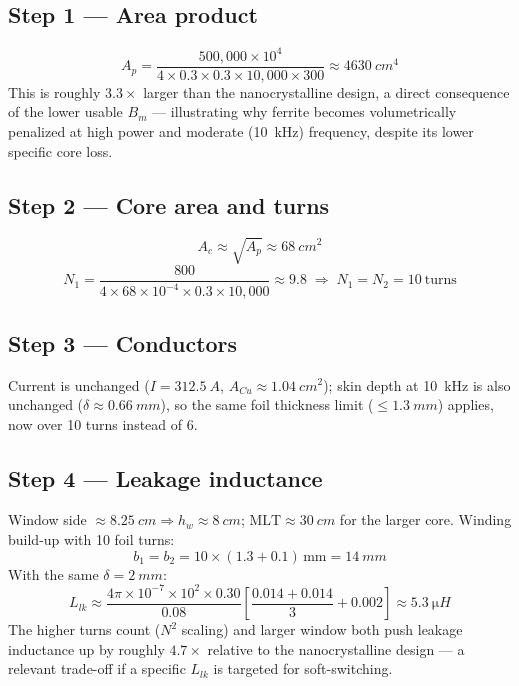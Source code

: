\documentclass[11pt,a4paper]{article}
\begin{document}
\subsection*{Step 1 — Area product}
\begin{equation}
    A_p = \frac{500{,}000\times10^4}{4\times0.3\times0.3\times10{,}000\times300}
    \approx \SI{4630}{cm^4}
\end{equation}
This is roughly $3.3\times$ larger than the nanocrystalline design, a direct
consequence of the lower usable $B_m$ — illustrating why ferrite becomes
volumetrically penalized at high power and moderate (\SI{10}{kHz}) frequency,
despite its lower specific core loss.

\subsection*{Step 2 — Core area and turns}
\begin{equation}
    A_c \approx \sqrt{A_p} \approx \SI{68}{cm^2}
\end{equation}
\begin{equation}
    N_1 = \frac{800}{4\times68\times10^{-4}\times0.3\times10{,}000}
    \approx 9.8 \;\Rightarrow\; N_1=N_2=10 \ \text{turns}
\end{equation}

\subsection*{Step 3 — Conductors}
Current is unchanged ($I=\SI{312.5}{A}$, $A_{Cu}\approx\SI{1.04}{cm^2}$); skin
depth at \SI{10}{kHz} is also unchanged ($\delta\approx\SI{0.66}{mm}$), so the
same foil thickness limit ($\le\SI{1.3}{mm}$) applies, now over 10 turns instead
of 6.

\subsection*{Step 4 — Leakage inductance}
Window side $\approx\SI{8.25}{cm}\Rightarrow h_w\approx\SI{8}{cm}$;
$\mathrm{MLT}\approx\SI{30}{cm}$ for the larger core. Winding build-up with 10
foil turns:
\begin{equation}
    b_1=b_2=10\times(1.3+0.1)\,\text{mm}=\SI{14}{mm}
\end{equation}
With the same $\delta=\SI{2}{mm}$:
\begin{equation}
    L_{lk} \approx \frac{4\pi\times10^{-7}\times10^2\times0.30}{0.08}
    \left[\frac{0.014+0.014}{3}+0.002\right] \approx \SI{5.3}{\micro H}
\end{equation}
The higher turns count ($N^2$ scaling) and larger window both push leakage
inductance up by roughly $4.7\times$ relative to the nanocrystalline design —
a relevant trade-off if a specific $L_{lk}$ is targeted for soft-switching.
\end{document}
